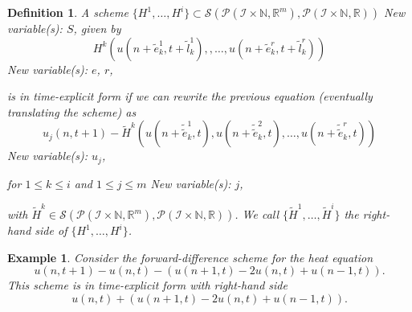 \documentclass[sigconf,twocolumn]{acmart}
\newcommand{\1}{{\chi}}
\numberwithin{equation}{section}
\theoremstyle{thmlemcorr}
\numberwithin{theorem}{section}
\theoremstyle{thmlemcorr*}
\theoremstyle{defi}
\newtheorem{definition}[theorem]{Definition}
\theoremstyle{remexample}
\newtheorem{example}[theorem]{Example}
\theoremstyle{ass}
\begin{document}
\begin{definition}
	A scheme \(\{H^1,\ldots,H^i\}\subset\mathcal{S}(\mathcal{P}({\mathcal{I}}\times{\mathbb{N}},{\mathbb{R}}^m),\mathcal{P}({\mathcal{I}}\times{\mathbb{N}},{\mathbb{R}}))\)
{\color{blue} New variable(s): \(S\),  }
 given by
	\begin{equation*}
		H^k(u(n+\tilde{e}_k^1,t+\tilde{l}_k^1),,\ldots,u(n+\tilde{e}_k^r,t+\tilde{l}_k^r))
	\end{equation*}
{\color{blue} New variable(s): \(e\), \(r\),  }

	is in time-explicit form if we can rewrite the previous equation (eventually translating the scheme) as
	\begin{equation*}
		u_j(n,t+1)-\tilde{H}^k(u(n+\tilde{\tilde{e}}_k^1,t),u(n+\tilde{\tilde{e}}_k^2,t),\ldots,u(n+\tilde{\tilde{e}}_k^r,t))
	\end{equation*}
{\color{blue} New variable(s): \(u_j\),  }

	for \(1\leq k\leq i\) and \(1\leq j\leq m\)
{\color{blue} New variable(s): \(j\),  }

	with \(\tilde{H}^k\in\mathcal{S}(\mathcal{P}({\mathcal{I}}\times{\mathbb{N}},{\mathbb{R}}^m),\mathcal{P}({\mathcal{I}}\times{\mathbb{N}},{\mathbb{R}}))\). We call \(\{\tilde{H}^1,\ldots,\tilde{H}^i\}\) the right-hand side of \(\{H^1,\ldots,H^i\}\).
\end{definition}
\begin{example}\label{timeexplicitheateq}
	Consider the forward-difference scheme for the heat equation \cite{smoller94}
	\begin{equation*}
		u(n,t+1)-u(n,t)-(u(n+1,t)-2u(n,t)+u(n-1,t)).
	\end{equation*}
	This scheme is in time-explicit form with right-hand side
	\begin{equation*}
		u(n,t)+(u(n+1,t)-2u(n,t)+u(n-1,t)).
	\end{equation*}
\end{example}
\end{document}
